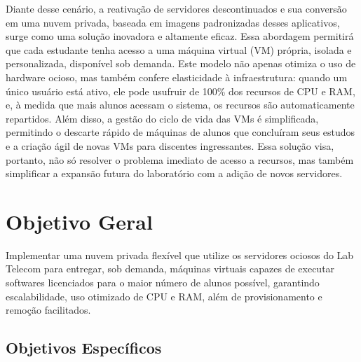 Diante desse cenário, a reativação de servidores descontinuados e sua conversão em uma nuvem privada, baseada em imagens padronizadas desses aplicativos, surge como uma solução inovadora e altamente eficaz. Essa abordagem permitirá que cada estudante tenha acesso a uma máquina virtual (VM) própria, isolada e personalizada, disponível sob demanda. Este modelo não apenas otimiza o uso de hardware ocioso, mas também confere elasticidade à infraestrutura: quando um único usuário está ativo, ele pode usufruir de 100\% dos recursos de CPU e RAM, e, à medida que mais alunos acessam o sistema, os recursos são automaticamente repartidos. Além disso, a gestão do ciclo de vida das VMs é simplificada, permitindo o descarte rápido de máquinas de alunos que concluíram seus estudos e a criação ágil de novas VMs para discentes ingressantes. Essa solução visa, portanto, não só resolver o problema imediato de acesso a recursos, mas também simplificar a expansão futura do laboratório com a adição de novos servidores.

\section{Objetivo Geral}

Implementar uma nuvem privada flexível que utilize os servidores ociosos do Lab Telecom para entregar, sob demanda, máquinas virtuais capazes de executar softwares licenciados para o maior número de alunos possível, garantindo escalabilidade, uso otimizado de CPU e RAM, além de provisionamento e remoção facilitados.

\subsection{Objetivos Específicos}

